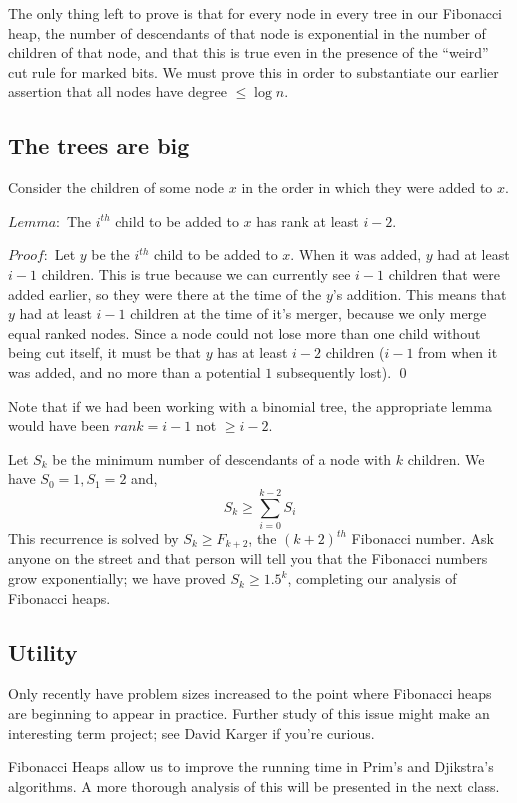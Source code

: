 \documentclass{article}
\begin{document}
The only thing left to prove is that for every node in every tree in our
Fibonacci heap, the number of descendants of that node is exponential in
the number of children of that node, and that this is true even in the
presence of the ``weird'' cut rule for marked bits.  We must prove this
in order to substantiate our earlier assertion that all nodes
have degree $\leq \log n$.

\subsection{The trees are big}

Consider the children of some node $x$ in the order in which they were
added to $x$.

$Lemma:$ The $i^{th}$ child to be added to $x$ has rank at
least $i-2$.

$Proof:$ Let $y$ be the $i^{th}$ child to be added to $x$. When it was added,
$y$ had at least $i-1$ children. This is true because we can currently see
$i-1$ children that were added earlier, so they were there at the time
of the $y$'s addition. This means that $y$ had
at least $i-1$ children at the time of it's merger, because we only merge
equal ranked nodes. Since a node could
not lose more than one child without being cut itself, it must be
that $y$ has at least $i-2$ children ($i-1$ from when it was added, and 
no more than a potential $1$ subsequently lost). 
\qed

Note that if we had been working with a binomial tree, the appropriate lemma
would
have been $rank = i-1$ not $\geq i-2$.

Let $S_k$ be the minimum number of descendants of a node with $k$
children. We have $S_0 = 1,  S_1 = 2 $ and, $$S_k \geq
\sum_{i=0}^{k-2}S_i$$
This recurrence is solved by $S_k \geq F_{k+2}$, the $(k+2)^{th}$ Fibonacci
number. Ask anyone on the street and that person will tell you that the
Fibonacci numbers grow exponentially; we have proved $S_k \geq 1.5^k$,
completing our analysis of Fibonacci heaps.

\subsection{Utility}

Only recently have problem sizes increased to the point where Fibonacci
heaps are beginning to appear in practice.
Further study of this issue might make an
interesting term project; see David Karger if you're curious.

Fibonacci Heaps allow us to improve the running time in Prim's
and Djikstra's algorithms. A more thorough analysis of this will be
presented in the next class.



\end{document}

